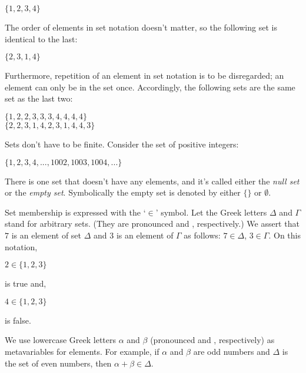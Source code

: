 \begin{center}
\noindent{}$\{1, 2, 3, 4\}$
\end{center}

\noindent{}The order of elements in set notation doesn't matter, so the following set is identical to the last:

\begin{center}
\noindent{}$\{2, 3, 1, 4\}$
\end{center}

\noindent{}Furthermore, repetition of an element in set notation is to be disregarded; an element can only be in the set once.  Accordingly, the following sets are the same set as the last two:

\begin{center}
\noindent{}$\{1, 2, 2, 3, 3, 3, 4, 4, 4, 4\}$\\
\noindent{}$\{2, 2, 3, 1, 4, 2, 3, 1, 4, 4, 3\}$
\end{center}

\noindent{}Sets don't have to be finite. Consider the set of positive integers:

\begin{center}
\noindent{}$\{1, 2, 3, 4, ..., 1002, 1003, 1004, ... \}$
\end{center}

There is one set that doesn't have any elements, and it's called either the \emph{null set} or the \emph{empty set}.  Symbolically the empty set is denoted by either $\{ \}$ or $\emptyset$.

Set membership is expressed with the `$\in$' symbol.  Let the Greek letters $\Delta$ and $\Gamma$ stand for arbitrary sets. (They are pronounced  and , respectively.)  We assert that $7$ is an element of set $\Delta$ and $3$ is an element of $\Gamma$ as follows: $7 \in \Delta$, $3 \in \Gamma$. On this notation,

\begin{center}
	\noindent{}$2\in\{1, 2, 3\}$
\end{center}

\noindent{}is true and,

\begin{center}
	\noindent{}$4\in\{1, 2, 3\}$ 
\end{center}

\noindent{}is false.

We use lowercase Greek letters $\alpha$ and $\beta$ (pronounced  and , respectively) as metavariables for elements. For example, if $\alpha$ and $\beta$ are odd numbers and $\Delta$ is the set of even numbers, then $\alpha + \beta \in \Delta$.

